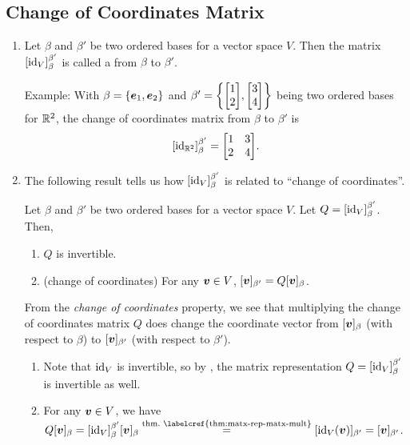 \subsection{Change of Coordinates Matrix}
\label{subsect:change-coord}
\begin{enumerate}
\item Let \(\beta\) and \(\beta'\) be two ordered bases for a vector space
\(V\). Then the matrix \([\operatorname{id}_{V}]_{\beta}^{\beta'}\) is called a  from \(\beta\) to \(\beta'\).

Example: With \(\beta=\{\vb*{e}_1,\vb*{e}_2\}\) and \(\beta'=\qty{\mqty[1\\
2],\mqty[3\\ 4]}\) being two ordered bases for \(\mathbb{R}^2\), the change of
coordinates matrix from \(\beta\) to \(\beta'\) is
\[
[\id_{\R^2}]_{\beta}^{\beta'}=\mqty[1&3\\ 2&4].
\]

\item The following result tells us how \([\operatorname{id}_{V}]_{\beta}^{\beta'}\) is
related to ``change of coordinates''.

\begin{theorem}
\label{thm:change-coord-matx-prop}
Let \(\beta\) and \(\beta'\) be two ordered bases for a vector space \(V\). Let
\(Q=[\operatorname{id}_{V}]_{\beta}^{\beta'}\). Then,
\begin{enumerate}
\item \(Q\) is invertible.
\item (change of coordinates) For any \(\vb*{v}\in V\),
\([\vb*{v}]_{\beta'}=Q[\vb*{v}]_{\beta}\).
\end{enumerate}
\end{theorem}
\begin{note}
From the \emph{change of coordinates} property, we see that multiplying the
change of coordinates matrix \(Q\) does change the coordinate vector from
\([\vb*{v}]_{\beta}\) (with respect to \(\beta\)) to \([\vb*{v}]_{\beta'}\)
(with respect to \(\beta'\)).
\end{note}

\begin{pf}
\begin{enumerate}
\item Note that \(\operatorname{id}_{V}\) is invertible, so by ,
the matrix representation \(Q=[\operatorname{id}_{V}]_{\beta}^{\beta'}\) is invertible as well.
\item For any \(\vb*{v}\in V\), we have
\(Q[\vect{v}]_{\beta}=[\id_{V}]_{\beta}^{\beta'}[\vect{v}]_{\beta}
\overset{\text{thm.\ \labelcref{thm:matx-rep-matx-mult}}}{=}[\id_{V}(\vect{v})]_{\beta'}
=[\vect{v}]_{\beta'}\).
\end{enumerate}
\end{pf}


\end{enumerate}
